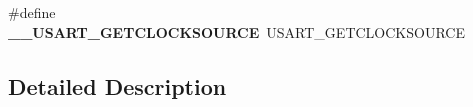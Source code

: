 \begin{DoxyCompactItemize}
\item 
\hypertarget{group___h_a_l___u_s_a_r_t___aliased___macros_gaa00a53bf6bc2bee096abb57d4ace2384}{\#define {\bfseries \-\_\-\-\_\-\-U\-S\-A\-R\-T\-\_\-\-G\-E\-T\-C\-L\-O\-C\-K\-S\-O\-U\-R\-C\-E}~U\-S\-A\-R\-T\-\_\-\-G\-E\-T\-C\-L\-O\-C\-K\-S\-O\-U\-R\-C\-E}\label{group___h_a_l___u_s_a_r_t___aliased___macros_gaa00a53bf6bc2bee096abb57d4ace2384}

\end{DoxyCompactItemize}


\subsection{Detailed Description}
